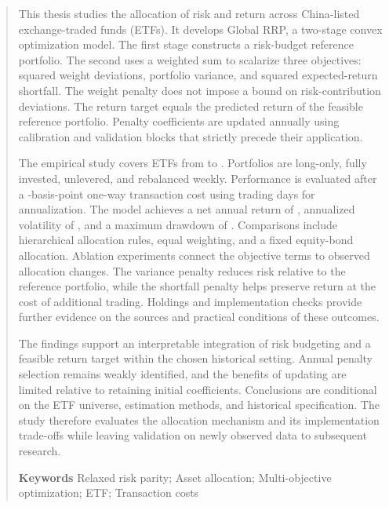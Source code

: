 \documentclass{thesisSWUFE}
\begin{document}
\begin{abstract}
This thesis studies the allocation of risk and return across China-listed exchange-traded funds (ETFs). It develops Global RRP, a two-stage convex optimization model. The first stage constructs a risk-budget reference portfolio. The second uses a weighted sum to scalarize three objectives: squared weight deviations, portfolio variance, and squared expected-return shortfall. The weight penalty does not impose a bound on risk-contribution deviations. The return target equals the predicted return of the feasible reference portfolio. Penalty coefficients are updated annually using calibration and validation blocks that strictly precede their application.

The empirical study covers \etfCount{} ETFs from \evalStartDate{} to \evalEndDate{}. Portfolios are long-only, fully invested, unlevered, and rebalanced weekly. Performance is evaluated after a \txCostBps{}-basis-point one-way transaction cost using \annualizationDays{} trading days for annualization. The model achieves a net annual return of \globalNetReturn, annualized volatility of \globalVolatility, and a maximum drawdown of \globalMaxDD. Comparisons include hierarchical allocation rules, equal weighting, and a fixed equity-bond allocation. Ablation experiments connect the objective terms to observed allocation changes. The variance penalty reduces risk relative to the reference portfolio, while the shortfall penalty helps preserve return at the cost of additional trading. Holdings and implementation checks provide further evidence on the sources and practical conditions of these outcomes.

The findings support an interpretable integration of risk budgeting and a feasible return target within the chosen historical setting. Annual penalty selection remains weakly identified, and the benefits of updating are limited relative to retaining initial coefficients. Conclusions are conditional on the ETF universe, estimation methods, and historical specification. The study therefore evaluates the allocation mechanism and its implementation trade-offs while leaving validation on newly observed data to subsequent research.

\noindent\textbf{Keywords } Relaxed risk parity; Asset allocation; Multi-objective optimization; ETF; Transaction costs
\end{abstract}
\clearpage
{}
\setcounter{tocdepth}{2}
\begingroup
\linespread{1.35}\selectfont
\tableofcontents
\endgroup
\clearpage
{}















\label{sec:body_end}
\clearpage
{}
{}


\end{document}
